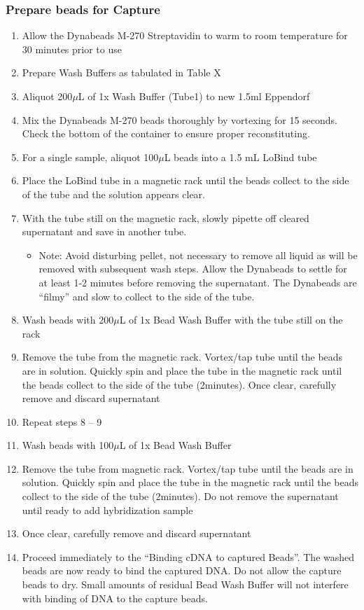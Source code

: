 \subsubsection{Prepare beads for Capture}
\begin{enumerate}
	\item Allow the Dynabeads M-270 Streptavidin to warm to room temperature for 30 minutes prior to use
	\item Prepare Wash Buffers as tabulated in Table X 
	\item Aliquot 200$\mu$L of 1x Wash Buffer (Tube1) to new 1.5ml Eppendorf 
	\item Mix the Dynabeads M-270 beads thoroughly by vortexing for 15 seconds. Check the bottom of the container to ensure proper reconstituting. 
	\item For a single sample, aliquot 100$\mu$L beads into a 1.5 mL LoBind tube
	\item Place the LoBind tube in a magnetic rack until the beads collect to the side of the tube and the solution appears clear. 
	\item With the tube still on the magnetic rack, slowly pipette off cleared supernatant and save in another tube. 
	\begin{itemize}
		\item Note: Avoid disturbing pellet, not necessary to remove all liquid as will be removed with subsequent wash steps. Allow the Dynabeads to settle for at least 1-2 minutes before removing the supernatant. The Dynabeads are “filmy” and slow to collect to the side of the tube.
	\end{itemize}
	\item Wash beads with 200$\mu$L of 1x Bead Wash Buffer with the tube still on the rack
	\item Remove the tube from the magnetic rack. Vortex/tap tube until the beads are in solution. Quickly spin and place the tube in the magnetic rack until the beads collect to the side of the tube (2minutes). Once clear, carefully remove and discard supernatant
	\item Repeat steps 8 – 9  
	\item Wash beads with 100$\mu$L of 1x Bead Wash Buffer 
	\item Remove the tube from magnetic rack. Vortex/tap tube until the beads are in solution. Quickly spin and place the tube in the magnetic rack until the beads collect to the side of the tube (2minutes). 
	Do not remove the supernatant until ready to add hybridization sample 
	\item Once clear, carefully remove and discard supernatant
	\item Proceed immediately to the “Binding cDNA to captured Beads”. The washed beads are now ready to bind the captured DNA. Do not allow the capture beads to dry. Small amounts of residual Bead Wash Buffer will not interfere with binding of DNA to the capture beads.
\end{enumerate} 


